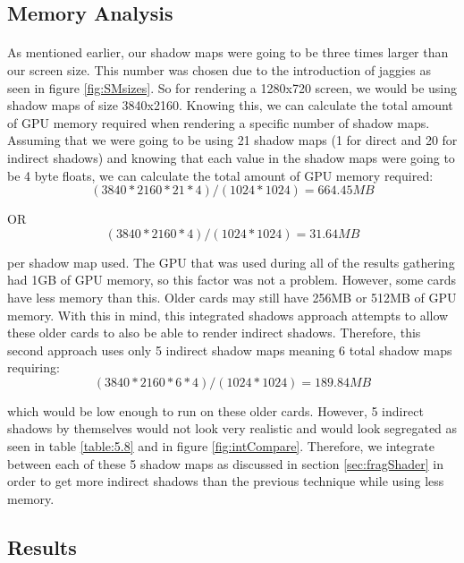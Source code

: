 \subsection{Memory Analysis}
\paragraph{}
As mentioned earlier, our shadow maps were going to be three times larger than our screen size.  This number was chosen due to the introduction of jaggies as seen in figure \ref{fig:SMsizes}.  So for rendering a 1280x720 screen, we would be using shadow maps of size 3840x2160.  Knowing this, we can calculate the total amount of GPU memory required when rendering a specific number of shadow maps.  Assuming that we were going to be using 21 shadow maps (1 for direct and 20 for indirect shadows) and knowing that each value in the shadow maps were going to be 4 byte floats, we can calculate the total amount of GPU memory required:
\begin{equation}
(3840*2160*21*4)/(1024*1024) = 664.45 MB
\end{equation}

OR
\begin{equation}
(3840*2160*4)/(1024*1024) = 31.64 MB
\end{equation}

per shadow map used.  The GPU that was used during all of the results gathering had 1GB of GPU memory, so this factor was not a problem.  However, some cards have less memory than this.  Older cards may still have 256MB or 512MB of GPU memory.  With this in mind, this integrated shadows approach attempts to allow these older cards to also be able to render indirect shadows.  Therefore, this second approach uses only 5 indirect shadow maps meaning 6 total shadow maps requiring:
\begin{equation}
(3840*2160*6*4)/(1024*1024) = 189.84 MB
\end{equation}

which would be low enough to run on these older cards.  However, 5 indirect shadows by themselves would not look very realistic and would look segregated as seen in table \ref{table:5.8} and in figure \ref{fig:intCompare}.  Therefore, we integrate between each of these 5 shadow maps as discussed in section \ref{sec:fragShader} in order to get more indirect shadows than the previous technique while using less memory.

\subsection{Results}
